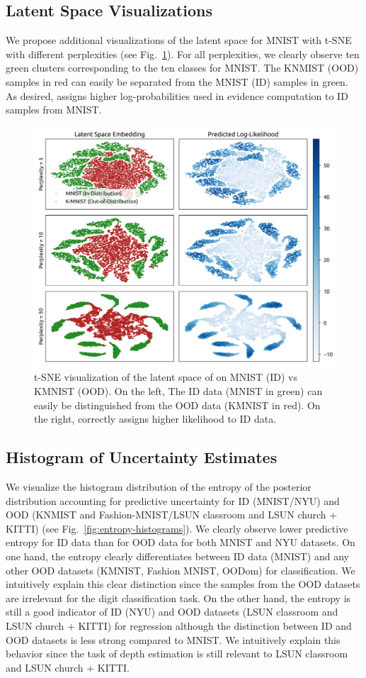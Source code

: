 \subsection{Latent Space Visualizations}

We propose additional visualizations of the latent space for MNIST with t-SNE \citep{tsne} with different perplexities (see Fig.~\ref{fig:latent-space}). For all perplexities, we clearly observe ten green clusters corresponding to the ten classes for MNIST. The KNMIST (OOD) samples in red can easily be separated from the MNIST (ID) samples in green. As desired, \NatPNacro{} assigns higher log-probabilities used in evidence computation to ID samples from MNIST.

\begin{figure}[ht!]
    \centering
    \includegraphics[width=0.6 \textwidth]{sections/007_iclr2022/resources/appendix/embedding-new.png}
    \caption{t-SNE visualization of the latent space of \NatPNacro{} on MNIST (ID) vs KMNIST (OOD). On the left, The ID data (MNIST in green) can easily be distinguished from the OOD data (KMNIST in red). On the right, \NatPNacro{} correctly assigns higher likelihood to ID data.}
    \label{fig:latent-space}
\end{figure}

\subsection{Histogram of Uncertainty Estimates}

We visualize the histogram distribution of the entropy of the posterior distribution accounting for predictive uncertainty for ID (MNIST/NYU) and OOD (KNMIST and Fashion-MNIST/LSUN classroom and LSUN church + KITTI) (see Fig.~\ref{fig:entropy-histograms}). We clearly observe lower predictive entropy for ID data than for OOD data for both MNIST and NYU datasets. On one hand, the entropy clearly differentiates between ID data (MNIST) and any other OOD datasets (KMNIST, Fashion MNIST, OODom) for classification. We intuitively explain this clear distinction since the samples from the OOD datasets are irrelevant for the digit classification task. On the other hand, the entropy is still a good indicator of ID (NYU) and OOD datasets (LSUN classroom and LSUN church + KITTI) for regression although the distinction between ID and OOD datasets is less strong compared to MNIST. We intuitively explain this behavior since the task of depth estimation is still relevant to LSUN classroom and LSUN church + KITTI.

